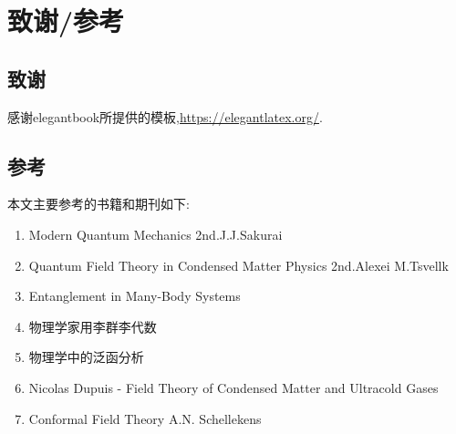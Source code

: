 \documentclass[lang=cn,newtx,10pt,scheme=chinese,thmcnt=section]{elegantbook}
\begin{document}
\chapter{致谢/参考}
\section{致谢}
感谢elegantbook所提供的模板,\href{https://elegantlatex.org/}{https://elegantlatex.org/}.\\

\section{参考}
本文主要参考的书籍和期刊如下:
\begin{enumerate}
	\item Modern Quantum Mechanics 2nd.J.J.Sakurai
	\item Quantum Field Theory in Condensed Matter Physics 2nd.Alexei M.Tsvellk
	\item Entanglement in Many-Body Systems
	\item 物理学家用李群李代数
	\item 物理学中的泛函分析
	\item Nicolas Dupuis - Field Theory of Condensed Matter and Ultracold Gases
	\item Conformal Field Theory A.N. Schellekens
\end{enumerate}
\end{document}
